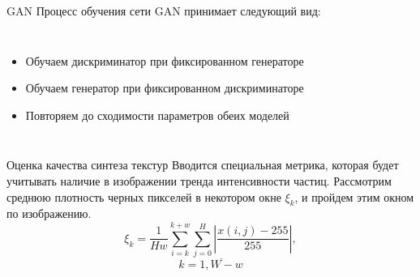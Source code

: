 \documentclass[12pt]{beamer}
\begin{document}
	\begin{frame}{GAN}
		Процесс обучения сети GAN принимает следующий вид:
		\begin{columns}
			\begin{itemize}
				\item Обучаем дискриминатор при фиксированном генераторе
				\item Обучаем генератор при фиксированном дискриминаторе
				\item Повторяем до сходимости параметров обеих моделей
			\end{itemize}
			\begin{figure}
			\end{figure}
		\end{columns}
	\end{frame}
	
	\begin{frame}{Оценка качества синтеза текстур}
		Вводится специальная метрика, которая будет учитывать наличие в изображении тренда интенсивности частиц. Рассмотрим среднюю плотность черных пикселей в некотором окне $\xi_k$, и пройдем этим окном по изображению.
		$$\xi_k = \frac{1}{H w}{\sum_{i=k}^{k+w} \sum_{j=0}^{H}\left| \frac{x(i, j) - 255}{255} \right|}, $$$$k = \overline{1, W - w} $$
	\end{frame}
	
\end{document}
